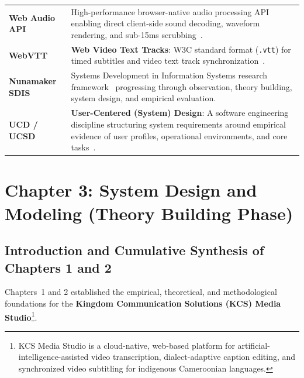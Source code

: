 \documentclass[a4paper,11pt]{article}
\begin{document}
\begin{table}[h!]
\begin{tabular}{>{\raggedright\arraybackslash}p{3.2cm} >{\raggedright\arraybackslash}p{14.3cm}}
\addlinespace
\textbf{Web Audio API} & High-performance browser-native audio processing API enabling direct client-side sound decoding, waveform rendering, and sub-15ms scrubbing~\cite{w3c2021webaudio}. \\
\addlinespace
\textbf{WebVTT} & \textbf{Web Video Text Tracks}: W3C standard format (\texttt{.vtt}) for timed subtitles and video text track synchronization~\cite{w3c2019webvtt}. \\
\addlinespace
\textbf{Nunamaker SDIS} & Systems Development in Information Systems research framework~\cite{nunamaker1990systems} progressing through observation, theory building, system design, and empirical evaluation. \\
\addlinespace
\textbf{UCD / UCSD} & \textbf{User-Centered (System) Design}: A software engineering discipline structuring system requirements around empirical evidence of user profiles, operational environments, and core tasks~\cite{norman1986user}. \\
\bottomrule
\end{tabular}
\end{table}

\mainmatter

\setcounter{section}{2}

\section{Chapter 3: System Design and Modeling (Theory Building Phase)}
\label{sec:chap3_design}

\subsection{Introduction and Cumulative Synthesis of Chapters 1 and 2}
\label{sec:chap3_intro}

Chapters~1 and 2 established the empirical, theoretical, and methodological foundations for the \textbf{Kingdom Communication Solutions (KCS) Media Studio}\footnote{KCS Media Studio is a cloud-native, web-based platform for artificial-intelligence-assisted video transcription, dialect-adaptive caption editing, and synchronized video subtitling for indigenous Cameroonian languages.}. 
\end{document}

